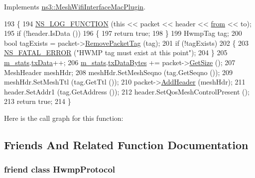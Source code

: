 Implements \hyperlink{classns3_1_1MeshWifiInterfaceMacPlugin_af14bbe6ab750951c0291b0e4144d2caf}{ns3\+::\+Mesh\+Wifi\+Interface\+Mac\+Plugin}.


\begin{DoxyCode}
193 \{
194   \hyperlink{log-macros-disabled_8h_a90b90d5bad1f39cb1b64923ea94c0761}{NS\_LOG\_FUNCTION} (\textcolor{keyword}{this} << packet << header << \hyperlink{lte__amc_8m_a1b4c81ff74eb1a626b5ade44c81004b3}{from} << to);
195   \textcolor{keywordflow}{if} (!header.IsData ())
196     \{
197       \textcolor{keywordflow}{return} \textcolor{keyword}{true};
198     \}
199   HwmpTag tag;
200   \textcolor{keywordtype}{bool} tagExists = packet->\hyperlink{classns3_1_1Packet_a078fe922d976a417ab25ba2f3c2fd667}{RemovePacketTag} (tag);
201   \textcolor{keywordflow}{if} (!tagExists)
202     \{
203       \hyperlink{group__fatal_ga5131d5e3f75d7d4cbfd706ac456fdc85}{NS\_FATAL\_ERROR} (\textcolor{stringliteral}{"HWMP tag must exist at this point"});
204     \}
205   \hyperlink{classns3_1_1dot11s_1_1HwmpProtocolMac_a72bb14d6985cc79bef9ac33fdcdb0a00}{m\_stats}.\hyperlink{structns3_1_1dot11s_1_1HwmpProtocolMac_1_1Statistics_a589e4207bdf4fa5f73350b602cc62395}{txData}++;
206   \hyperlink{classns3_1_1dot11s_1_1HwmpProtocolMac_a72bb14d6985cc79bef9ac33fdcdb0a00}{m\_stats}.\hyperlink{structns3_1_1dot11s_1_1HwmpProtocolMac_1_1Statistics_a50db26efb7b9d224d4c803000a31ae39}{txDataBytes} += packet->\hyperlink{classns3_1_1Packet_a462855c9929954d4301a4edfe55f4f1c}{GetSize} ();
207   MeshHeader meshHdr;
208   meshHdr.SetMeshSeqno (tag.GetSeqno ());
209   meshHdr.SetMeshTtl (tag.GetTtl ());
210   packet->\hyperlink{classns3_1_1Packet_a465108c595a0bc592095cbcab1832ed8}{AddHeader} (meshHdr);
211   header.SetAddr1 (tag.GetAddress ());
212   header.SetQosMeshControlPresent ();
213   \textcolor{keywordflow}{return} \textcolor{keyword}{true};
214 \}
\end{DoxyCode}


Here is the call graph for this function\+:




\subsection{Friends And Related Function Documentation}
\subsubsection[{\texorpdfstring{Hwmp\+Protocol}{HwmpProtocol}}]{\setlength{\rightskip}{0pt plus 5cm}friend class {\bf Hwmp\+Protocol}\hspace{0.3cm}{\ttfamily [friend]}}\hypertarget{classns3_1_1dot11s_1_1HwmpProtocolMac_ab167f03f2bcac9989eb4e637bc9da429}{}\label{classns3_1_1dot11s_1_1HwmpProtocolMac_ab167f03f2bcac9989eb4e637bc9da429}


